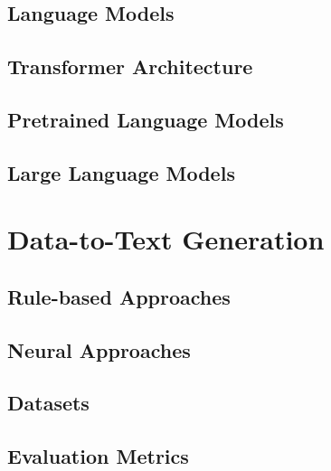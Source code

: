 



\subsection{Language Models}
\label{sec:lm-basics}
\subsection{Transformer Architecture}
\label{sec:transformer}
\subsection{Pretrained Language Models}
\label{sec:plms}
\subsection{Large Language Models}
\label{sec:llms}
\section{Data-to-Text Generation}
\label{sec:d2t}
\subsection{Rule-based Approaches}
\label{sec:rule-d2t}
\subsection{Neural Approaches}
\label{sec:neural-d2t}
\subsection{Datasets}
\label{sec:datasets}
\subsection{Evaluation Metrics}
\label{sec:evaluation}